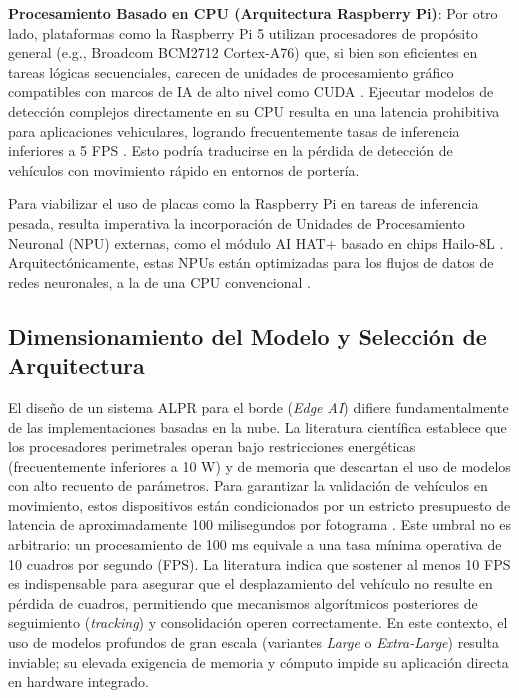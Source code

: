 \textbf{Procesamiento Basado en CPU (Arquitectura Raspberry Pi)}: 
Por otro lado, plataformas como la Raspberry Pi 5 utilizan procesadores de propósito 
general (e.g., Broadcom BCM2712 Cortex-A76) que, si bien son eficientes en tareas 
lógicas secuenciales, carecen de unidades de procesamiento gráfico compatibles con 
marcos de IA de alto nivel como CUDA \parencite{oluwaseyiComparativeAnalysisYOLOv52025}. 
Ejecutar modelos de detección complejos directamente en su CPU resulta en una latencia 
prohibitiva para aplicaciones vehiculares, logrando frecuentemente tasas de inferencia 
inferiores a 5 FPS \parencite{oluwaseyiComparativeAnalysisYOLOv52025, xuDeepLearningAlgorithms2026c}. 
Esto podría traducirse en la pérdida de detección de vehículos con movimiento rápido en 
entornos de portería.

Para viabilizar el uso de placas como la Raspberry Pi en tareas de inferencia pesada, 
resulta imperativa la incorporación de Unidades de Procesamiento Neuronal (NPU) externas, 
como el módulo AI HAT+ basado en chips Hailo-8L \parencite{oluwaseyiComparativeAnalysisYOLOv52025}. 
Arquitectónicamente, estas NPUs están optimizadas para los flujos de datos de redes neuronales, 
a la de una CPU convencional \parencite{oluwaseyiComparativeAnalysisYOLOv52025, xuDeepLearningAlgorithms2026c}.

\subsection{Dimensionamiento del Modelo y Selección de Arquitectura}

El diseño de un sistema ALPR para el borde (\textit{Edge AI}) difiere fundamentalmente de las implementaciones basadas en la nube. La literatura científica establece que los procesadores perimetrales operan bajo restricciones energéticas (frecuentemente inferiores a 10 W) y de memoria que descartan el uso de modelos con alto recuento de parámetros. Para garantizar la validación de vehículos en movimiento, estos dispositivos están condicionados por un estricto presupuesto de latencia de aproximadamente 100 milisegundos por fotograma \parencite{sonnaraEfficientRealtimeLicense2025}. Este umbral no es arbitrario: un procesamiento de 100 ms equivale a una tasa mínima operativa de 10 cuadros por segundo (FPS). La literatura indica que sostener al menos 10 FPS es indispensable para asegurar que el desplazamiento del vehículo no resulte en pérdida de cuadros, permitiendo que mecanismos algorítmicos posteriores de seguimiento (\textit{tracking}) y consolidación operen correctamente. En este contexto, el uso de modelos profundos de gran escala (variantes \textit{Large} o \textit{Extra-Large}) resulta inviable; su elevada exigencia de memoria y cómputo impide su aplicación directa en hardware integrado.

